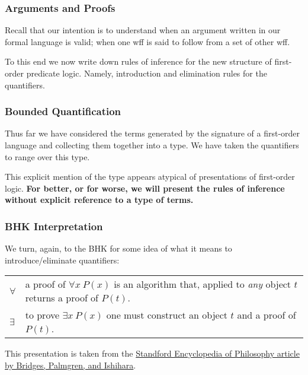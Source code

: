 \documentclass{beamer}
\theoremstyle{indentDefn} \newtheorem{defn}[]{Definition}
\begin{document}
\begin{frame}
	\frametitle{Arguments and Proofs}
	
	Recall that our intention is to understand when an argument written in our formal language is valid; when one wff is said to follow from a set of other wff. 
  
	\vspace{2mm}
	
	To this end we now write down rules of inference for the new structure of first-order predicate logic. Namely, introduction and elimination rules for the quantifiers. 
	
\end{frame}

\begin{frame}
	\frametitle{Bounded Quantification}

	Thus far we have considered the terms generated by the signature of a first-order language and collecting them together into a type. We have taken the quantifiers to range over this type. 

	\vspace{3cm}

	This explicit mention of the type appears atypical of presentations of first-order logic. {\bf For better, or for worse, we will present the rules of inference without explicit reference to a type of terms.}

\end{frame}

\begin{frame}
	\frametitle{BHK Interpretation}
	
	We turn, again, to the BHK for some idea of what it means to introduce/eliminate quantifiers: 
	
	\vspace{0.2cm}
	
	\begin{center}
		\begin{tabular}{p{1.5cm}p{8cm}}
		$\forall$ & a proof of $\forall x \ P(x)$ is an algorithm that, applied to \emph{any} object $t$ returns a proof of $P(t)$.\\
		$\exists$ & to prove $\exists x \ P(x)$ one must construct an object $t$ and a proof of $P(t)$. 
		\end{tabular}
	\end{center}
	
	This presentation is taken from the \href{https://plato.stanford.edu/archIves/fall2024/entries/mathematics-constructive/}{Standford Encyclopedia of Philosophy article by Bridges, Palmgren, and Ishihara}.

\end{frame}
\end{document}
